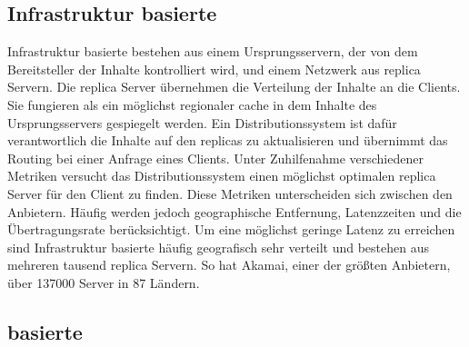 \subsection{Infrastruktur basierte \cdns}
Infrastruktur basierte \cdns bestehen aus einem Ursprungsservern, der von dem Bereitsteller der Inhalte kontrolliert wird, und einem Netzwerk aus replica Servern. Die replica Server übernehmen die Verteilung der Inhalte an die Clients. Sie fungieren als ein möglichst regionaler cache in dem Inhalte des Ursprungsservers gespiegelt werden. Ein Distributionssystem ist dafür verantwortlich die Inhalte auf den replicas zu aktualisieren und übernimmt das Routing bei einer Anfrage eines Clients. Unter Zuhilfenahme verschiedener Metriken versucht das Distributionssystem einen möglichst optimalen replica Server für den Client zu finden. Diese Metriken unterscheiden sich zwischen den Anbietern. Häufig werden jedoch geographische Entfernung, Latenzzeiten und die Übertragungsrate berücksichtigt. Um eine möglichst geringe Latenz zu erreichen sind Infrastruktur basierte \cdns häufig geografisch sehr verteilt und bestehen aus mehreren tausend replica Servern. So hat Akamai, einer der größten \cdn Anbietern, über 137000 Server in 87 Ländern. \cite{akamaiPeer} 


\subsection{\pTp basierte \cdns }



%
%

